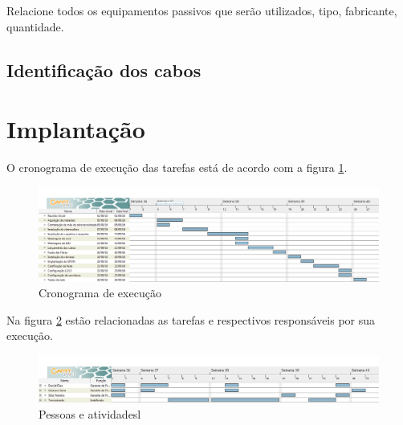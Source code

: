 \documentclass[	DIV=calc,%
							paper=a4,%
							fontsize=12pt,%
							onecolumn]{scrartcl}	 					%
\begin{document}
Relacione todos os equipamentos passivos que serão utilizados, tipo, fabricante, quantidade.

\subsection{Identificação dos cabos}

\section{Implantação}

O cronograma de execução das tarefas está de acordo com a figura \ref{tarefas}.

\begin{figure}
\centering
\includegraphics[width=\textwidth]{tarefas}
\caption{Cronograma de execução}
\label{tarefas}
\end{figure}

Na figura \ref{pessoas} estão relacionadas as tarefas e respectivos responsáveis por sua execução.

\begin{figure}
\centering
\includegraphics[width=\textwidth]{pessoas}
\caption{Pessoas e atividadesl}
\label{pessoas}
\end{figure}

\end{document}
